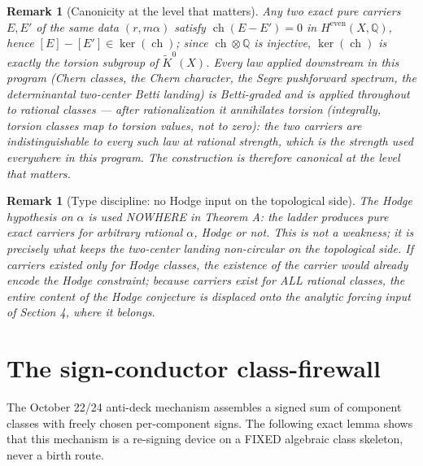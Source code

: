 \documentclass[11pt]{article}
\newtheorem{remark}[theorem]{Remark}
\newcommand{\ch}{\operatorname{ch}}
\begin{document}
\begin{remark}[Canonicity at the level that matters]
\label{rem:torsion}
Any two exact pure carriers $E,E'$ of the same data $(r,m\alpha)$
satisfy $\ch(E-E')=0$ in $H^{\mathrm{even}}(X,\mathbb Q)$, hence
$[E]-[E']\in\ker(\ch)$; since $\ch\otimes\mathbb Q$ is injective,
$\ker(\ch)$ is exactly the torsion subgroup of $\widetilde K^0(X)$.
Every law applied downstream in this program (Chern classes, the
Chern character, the Segre pushforward spectrum, the determinantal
two-center Betti landing) is Betti-graded and is applied throughout
to rational classes --- after rationalization it annihilates torsion
(integrally, torsion classes map to torsion values, not to zero):
the two carriers are indistinguishable to every such law at rational
strength, which is the strength used everywhere in this program.
The construction is therefore canonical at the level that matters.
\end{remark}

\begin{remark}[Type discipline: no Hodge input on the topological side]
\label{rem:typediscipline}
The Hodge hypothesis on $\alpha$ is used NOWHERE in Theorem A: the
ladder produces pure exact carriers for arbitrary rational
$\alpha$, Hodge or not. This is not a weakness; it is precisely what
keeps the two-center landing non-circular on the topological side.
If carriers existed only for Hodge classes, the existence of the
carrier would already encode the Hodge constraint; because carriers
exist for ALL rational classes, the entire content of the Hodge
conjecture is displaced onto the analytic forcing input of
Section 4, where it belongs.
\end{remark}

\section{The sign-conductor class-firewall}
The October 22/24 anti-deck mechanism assembles a signed sum of
component classes with freely chosen per-component signs. The
following exact lemma shows that this mechanism is a re-signing device
on a FIXED algebraic class skeleton, never a birth route.
\end{document}
